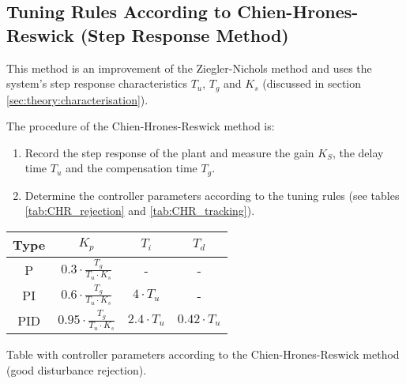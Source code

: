 \subsection{Tuning Rules According to Chien-Hrones-Reswick (Step Response Method)}

This  method is an improvement of the  Ziegler-Nichols  method  and  uses  the
system's step response characteristics $T_u$, $T_g$ and  $K_s$  (discussed  in
section \ref{sec:theory:characterisation}).

The procedure of the Chien-Hrones-Reswick method is:

\begin{enumerate}
    \item Record the step response of the plant and measure the gain $K_{S}$, the delay time $T_{u}$ and the compensation time $T_{g}$.
    \item Determine the controller parameters according to the tuning rules (see tables \ref{tab:CHR_rejection} and \ref{tab:CHR_tracking}).
\end{enumerate}

\begin{center}
    \begin{threeparttable}
        \begin{tabular}{cccc}
            \toprule
            Type & $K_p$                                    &  $T_{i}$            &  $T_{d}$ \\
            \midrule
            P    &  $0.3   \cdot\frac{T_g}{T_u \cdot K_s}$  &  -                  &  -                  \\
            PI   &  $0.6   \cdot\frac{T_g}{T_u \cdot K_s}$  &  $4 \cdot T_u$      &  -                  \\
            PID  &  $0.95  \cdot\frac{T_g}{T_u \cdot K_s}$  &  $2.4 \cdot T_u$    &  $0.42 \cdot T_u$   \\
            \bottomrule
        \end{tabular}
        \caption{Table with controller parameters according to the Chien-Hrones-Reswick method (good disturbance rejection).}
        \label{tab:CHR_rejection}
    \end{threeparttable}
\end{center}

